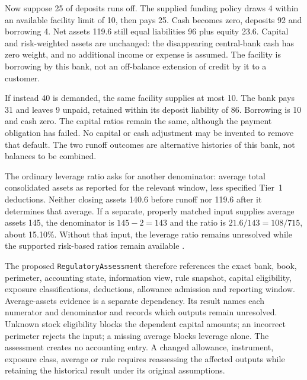 Now suppose 25 of deposits runs off. The supplied funding policy draws 4
within an available facility limit of 10, then pays 25. Cash becomes zero,
deposits 92 and borrowing 4. Net assets 119.6 still equal liabilities 96
plus equity 23.6. Capital and risk-weighted assets are unchanged: the
disappearing central-bank cash has zero weight, and no additional income
or expense is assumed. The facility is borrowing by this bank, not an
off-balance extension of credit by it to a customer.

If instead 40 is demanded, the same facility supplies at most 10. The bank
pays 31 and leaves 9 unpaid, retained within its deposit liability of 86.
Borrowing is 10 and cash zero. The capital ratios remain the same, although
the payment obligation has failed. No capital or cash adjustment may be
invented to remove that default. The two runoff outcomes are alternative
histories of this bank, not balances to be combined.

The ordinary leverage ratio asks for another denominator: average total
consolidated assets as reported for the relevant window, less specified
Tier~1 deductions. Neither closing assets 140.6 before runoff nor 119.6
after it determines that average. If a separate, properly matched input
supplies average assets 145, the denominator is \(145-2=143\) and the
ratio is \(21.6/143=108/715\), about 15.10\%. Without that input, the
leverage ratio remains unresolved while the supported risk-based ratios
remain available \citep[12~CFR~3.10(b)(4)]{occcapitalratios2026}.

The proposed \texttt{RegulatoryAssessment} therefore references the exact
bank, book, perimeter, accounting state, information view, rule snapshot,
capital eligibility, exposure classifications, deductions, allowance
admission and reporting window. Average-assets evidence is a separate
dependency. Its result names each numerator and denominator and records
which outputs remain unresolved. Unknown stock eligibility blocks the
dependent capital amounts; an incorrect perimeter rejects the input; a
missing average blocks leverage alone. The assessment creates no accounting
entry. A changed allowance, instrument, exposure class, average or rule
requires reassessing the affected outputs while retaining the historical
result under its original assumptions.

